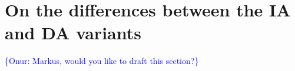 \documentclass[gmd, manuscript]{copernicus}
\newcommand{\onur}[1]{\textcolor{blue}{\{Onur: #1\}}}
\begin{document}
\section{On the differences between the IA and DA variants}\label{S:appIADA}  %
\onur{Markus, would you like to draft this section?}

\noappendix%













\end{document}
